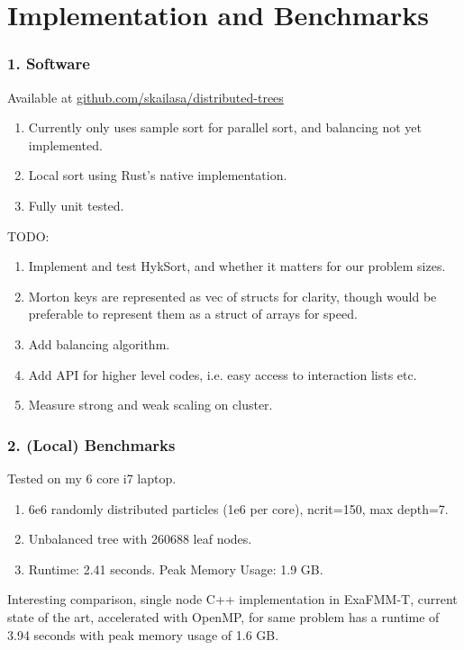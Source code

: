 \section{Implementation and Benchmarks}


\begin{frame}
    \frametitle{1. Software}
    Available at \href{https://github.com/skailasa/distributed-trees}{github.com/skailasa/distributed-trees}
    \begin{enumerate}
        \item Currently only uses sample sort for parallel sort, and balancing not yet implemented.
        \item Local sort using Rust's native implementation.
        \item Fully unit tested.
    \end{enumerate}

    TODO:
    \begin{enumerate}
        \item Implement and test HykSort, and whether it matters for our problem sizes.
        \item Morton keys are represented as vec of structs for clarity, though would be preferable to represent them as a struct of arrays for speed.
        \item Add balancing algorithm.
        \item Add API for higher level codes, i.e. easy access to interaction lists etc.
        \item Measure strong and weak scaling on cluster.
    \end{enumerate}
\end{frame}


\begin{frame}
    \frametitle{2. (Local) Benchmarks}
    Tested on my 6 core i7 laptop.

    \begin{enumerate}
        \item 6e6 randomly distributed particles (1e6 per core), ncrit=150, max depth=7.
        \item Unbalanced tree with 260688 leaf nodes.
        \item Runtime: 2.41 seconds. Peak Memory Usage: 1.9 GB.
    \end{enumerate}

    Interesting comparison, single node C++ implementation in ExaFMM-T, current state of the art, accelerated with OpenMP, for same problem has a runtime of 3.94 seconds with peak memory usage of 1.6 GB.

\end{frame}
